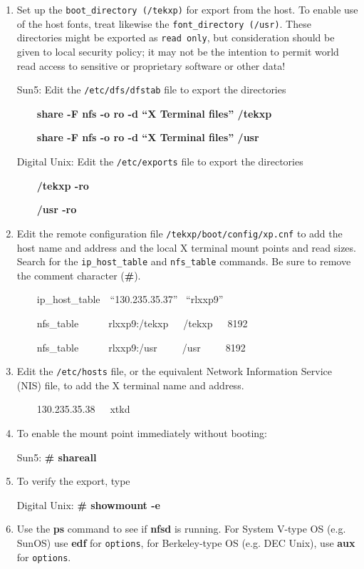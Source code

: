 \begin {enumerate}

\item Set up the {\tt boot\_directory (/tekxp)} for export from the host. To
enable use of the host fonts, treat likewise the {\tt font\_directory (/usr)}.
These directories might be exported as {\tt read only}, but consideration
should be given to local security policy; it may not be the intention to
permit world read access to sensitive or proprietary software or other data!

Sun5: Edit the {\tt /etc/dfs/dfstab} file to export the directories

\ \ \ \ {\bf share -F nfs -o ro -d ``X Terminal files'' /tekxp}

\ \ \ \ {\bf share -F nfs -o ro -d ``X Terminal files'' /usr}

Digital Unix: Edit the {\tt /etc/exports} file to export the directories

\ \ \ \ {\bf /tekxp -ro}

\ \ \ \ {\bf /usr -ro}

\item Edit the remote configuration file {\tt /tekxp/boot/config/xp.cnf} to add
the host name and address and the local X terminal mount points and read sizes.
Search for the {\tt ip\_host\_table} and {\tt nfs\_table} commands. Be sure to
remove the comment character ({\bf \#}).

\ \ \ \ ip\_host\_table\ \ ``130.235.35.37'' \ ``rlxxp9''

\ \ \ \ nfs\_table\ \ \ \ \ \ rlxxp9:/tekxp\ \ \ /tekxp\ \ \ 8192

\ \ \ \ nfs\_table\ \ \ \ \ \ rlxxp9:/usr\ \ \ \ \ /usr\ \ \ \ \ 8192

\item Edit the {\tt /etc/hosts} file, or the equivalent Network Information
Service (NIS) file, to add the X terminal name and address.

\ \ \ \ 130.235.35.38\ \ \ xtkd

\item To enable the mount point immediately without booting:

Sun5: {\bf \# shareall}

\item To verify the export, type

Digital Unix: {\bf \# showmount -e}

\item Use the {\bf ps} command to see if {\bf nfsd} is running. For System
V-type OS (e.g. SunOS) use {\bf edf} for {\tt options}, for Berkeley-type OS
(e.g. DEC Unix), use {\bf aux} for {\tt options}.


\end{enumerate}
